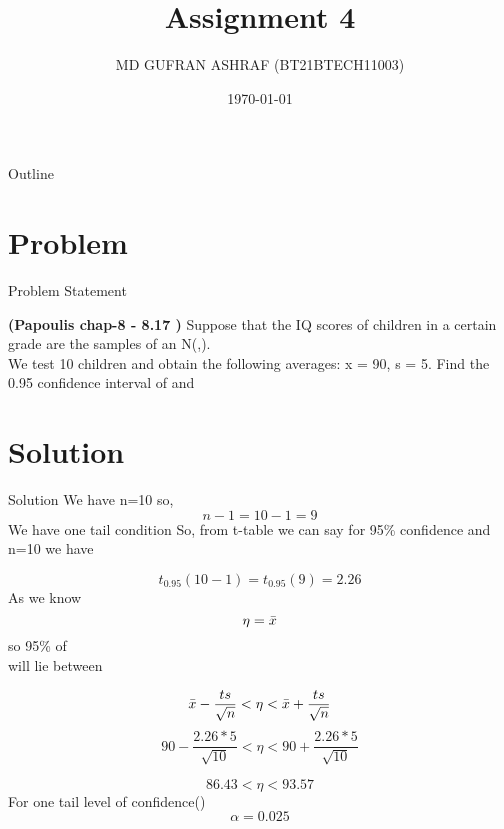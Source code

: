 \documentclass{beamer}
\title{Assignment 4 }
\author{MD GUFRAN ASHRAF (BT21BTECH11003)}
\date{\today}
\begin{document}
\begin{frame}
    \titlepage 
\end{frame}

\begin{frame}{Outline}
    \tableofcontents
\end{frame}


\section{Problem}
\begin{frame}{Problem Statement}

\textbf{(Papoulis chap-8 - 8.17 )}
Suppose that the IQ scores of children in a certain grade are the samples of an N({\eta,\sigma}).\\We test 10 children and obtain the following averages: x = 90, s = 5.
Find the 0.95 confidence interval of \sigma  and  \eta

\end{frame}


\section{Solution}
\begin{frame}{Solution}
We have n=10 so,
\begin{equation}
   n-1=10-1=9
\end{equation}
We have one tail condition
So, from t-table we can say for 95\% confidence and n=10 we have

    $$ t_{0.95}(10-1)=t_{0.95}(9)=2.26 $$
As we know
\begin{equation}
    \eta=\Bar{x} 
\end{equation}
so 95\% of \eta \\will lie between
\end{frame} 

\begin{frame}

\begin{equation}
   \Bar{x}-\frac{ts}{\sqrt{n}} < \eta < \Bar{x} + \frac{ts}{\sqrt{n}}
\end{equation}
\begin{equation}
   90-\frac{2.26*5}{\sqrt{10}} < \eta < 90 + \frac{2.26*5}{\sqrt{10}}
\end{equation}

\begin{equation}
    86.43 < \eta < 93.57
\end{equation}
For one tail level of confidence(\alpha)\\ 
\begin{equation}
    \alpha=0.025
\end{equation}
\end{frame}
\end{document}

